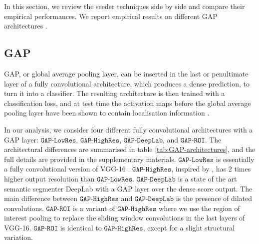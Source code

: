 \documentclass[british,10pt,twocolumn,letterpaper]{article}
\begin{document}
 In this section, we review the seeder techniques side by side and
 compare their empirical performances. We report empirical results
 on different GAP architectures \cite{zhou2015cnnlocalization,kolesnikov2016seed,Chen2016ArxivDeeplabv2}. 


\subsection{GAP}

\noindent GAP, or global average pooling layer, can be inserted in
the last or penultimate layer of a fully convolutional architecture,
which produces a dense prediction, to turn it into a classifier. The
resulting architecture is then trained with a classification loss,
and at test time the activation maps before the global average pooling
layer have been shown to contain localisation information \cite{zhou2015cnnlocaliz     ation}. 

In our analysis, we consider four different fully convolutional architectures
with a GAP layer: $\mathtt{GAP}\text{-}\mathtt{LowRes}$, $\mathtt{GAP}\text{-}\mathtt{HighRes}$,
$\mathtt{GAP}\text{-}\mathtt{DeepLab}$, and $\mathtt{GAP}\text{-}\mathtt{ROI}$.
The architectural differences are summarised in table \ref{tab:GAP-architectures},
 and the full details are provided in the supplementary materials.
 $\mathtt{GAP}\text{-}\mathtt{LowRes}$ \cite{zhou2015cnnlocalization}
 is essentially a fully convolutional version of VGG-16 \cite{Simonyan2015Iclr}.
 $\mathtt{GAP}\text{-}\mathtt{HighRes}$, inspired by \cite{kolesnikov2016seed},
 has $2$ times higher output resolution than $\mathtt{GAP}\text{-}\mathtt{LowRes}$.
 $\mathtt{GAP}\text{-}\mathtt{DeepLab}$ is a state of the art semantic
 segmenter DeepLab with a GAP layer over the dense score output. The
 main difference between $\mathtt{GAP}\text{-}\mathtt{HighRes}$ and
 $\mathtt{GAP}\text{-}\mathtt{DeepLab}$ is the presence of dilated
 convolutions. $\mathtt{GAP}\text{-}\mathtt{ROI}$ is a variant of
 $\mathtt{GAP}\text{-}\mathtt{HighRes}$ where we use the region of
 interest pooling to replace the sliding window convolutions in the
 last layers of VGG-16. $\mathtt{GAP}\text{-}\mathtt{ROI}$ is identical
 to $\mathtt{GAP}\text{-}\mathtt{HighRes}$, except for a slight structural
 variation.
\end{document}
